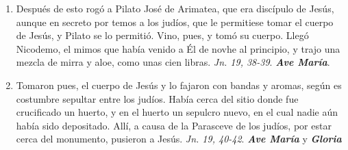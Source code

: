 \documentclass[../../devocionario.tex]{subfiles}
\begin{document}
\begin{enumerate}
        \item Después de esto rogó a Pilato José de Arimatea, que era discípulo de Jesús, aunque en secreto por temos a los judíos,
            que le permitiese tomar el cuerpo de Jesús, y Pilato se lo permitió. Vino, pues, y tomó su cuerpo. Llegó Nicodemo, el mimos
            que había venido a Él de novhe al principio, y trajo una mezcla de mirra y aloe, como unas cien libras.
            \textit{Jn. 19, 38-39}. \textbf{\textit{Ave María}}.            

        \item Tomaron pues, el cuerpo de Jesús y lo fajaron con bandas y aromas, según es costumbre sepultar entre los judíos. Había cerca
            del sitio donde fue crucificado un huerto, y en el huerto un sepulcro nuevo, en el cual nadie aún había sido depositado.
            Allí, a causa de la Parasceve de los judíos, por estar cerca del monumento, pusieron a Jesús. 
            \textit{Jn. 19, 40-42}. \textbf{\textit{Ave María}} y \textbf{\textit{Gloria}}

    \end{enumerate}
\end{document}
